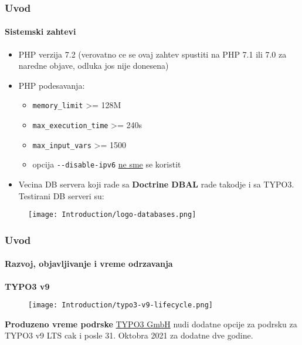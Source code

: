 \begin{frame}[fragile]
	\frametitle{Uvod}
	\framesubtitle{Sistemski zahtevi}

	\begin{itemize}
		\item PHP verzija 7.2\newline
			\smaller
				(verovatno ce se ovaj zahtev spustiti na PHP 7.1 ili 7.0 za naredne objave, odluka jos nije donesena)
			\normalsize

		\item PHP podesavanja:

			\begin{itemize}
				\item \texttt{memory\_limit} >= 128M
				\item \texttt{max\_execution\_time} >= 240s
				\item \texttt{max\_input\_vars} >= 1500
				\item opcija \texttt{-}\texttt{-disable-ipv6} \underline{ne sme} se koristit
			\end{itemize}

		\item Vecina DB servera koji rade sa \textbf{Doctrine DBAL} rade takodje i sa TYPO3.
			Testirani DB serveri su:
	\end{itemize}

	\begin{figure}
		\texttt{[image: Introduction/logo-databases.png]}
	\end{figure}

\end{frame}

\begin{frame}[fragile]
	\frametitle{Uvod}
	\framesubtitle{Razvoj, objavljivanje i vreme odrzavanja}

	\textbf{TYPO3 v9}

	\begin{figure}
		\texttt{[image: Introduction/typo3-v9-lifecycle.png]}
	\end{figure}

	\textbf{Produzeno vreme podrske}\newline
	\smaller
		\href{https://typo3.com}{TYPO3 GmbH} nudi dodatne opcije za podrsku za TYPO3 v9 LTS 
		cak i posle 31. Oktobra 2021 za dodatne dve godine.
	\normalsize


\end{frame}

